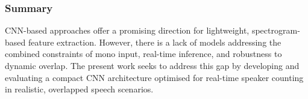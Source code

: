 \subsubsection{Summary}
CNN-based approaches offer a promising direction for lightweight, spectrogram-based feature extraction. However, there is a lack of models addressing the combined constraints of mono input, real-time inference, and robustness to dynamic overlap. The present work seeks to address this gap by developing and evaluating a compact CNN architecture optimised for real-time speaker counting in realistic, overlapped speech scenarios.